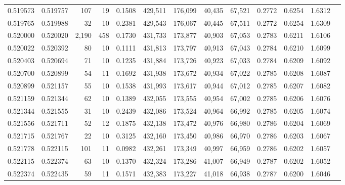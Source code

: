 \begin{tabular}{rrrrrrrrrrrrr}
0.519573 & 0.519757 &   107 &  19 &                                     0.1508 & 429,511 & 176,099 &  40,435 &  67,521 & 0.2772 & 0.6254 & 1.6312 \\
0.519765 & 0.519988 &    32 &  10 &                                     0.2381 & 429,543 & 176,067 &  40,445 &  67,511 & 0.2772 & 0.6254 & 1.6309 \\
0.520000 & 0.520020 & 2,190 & 458 &                                     0.1730 & 431,733 & 173,877 &  40,903 &  67,053 & 0.2783 & 0.6211 & 1.6106 \\
0.520022 & 0.520392 &    80 &  10 &                                     0.1111 & 431,813 & 173,797 &  40,913 &  67,043 & 0.2784 & 0.6210 & 1.6099 \\
0.520403 & 0.520694 &    71 &  10 &                                     0.1235 & 431,884 & 173,726 &  40,923 &  67,033 & 0.2784 & 0.6209 & 1.6092 \\
0.520700 & 0.520899 &    54 &  11 &                                     0.1692 & 431,938 & 173,672 &  40,934 &  67,022 & 0.2785 & 0.6208 & 1.6087 \\
0.520899 & 0.521157 &    55 &  10 &                                     0.1538 & 431,993 & 173,617 &  40,944 &  67,012 & 0.2785 & 0.6207 & 1.6082 \\
0.521159 & 0.521344 &    62 &  10 &                                     0.1389 & 432,055 & 173,555 &  40,954 &  67,002 & 0.2785 & 0.6206 & 1.6076 \\
0.521344 & 0.521555 &    31 &  10 &                                     0.2439 & 432,086 & 173,524 &  40,964 &  66,992 & 0.2785 & 0.6205 & 1.6074 \\
0.521556 & 0.521711 &    52 &  12 &                                     0.1875 & 432,138 & 173,472 &  40,976 &  66,980 & 0.2786 & 0.6204 & 1.6069 \\
0.521715 & 0.521767 &    22 &  10 &                                     0.3125 & 432,160 & 173,450 &  40,986 &  66,970 & 0.2786 & 0.6203 & 1.6067 \\
0.521778 & 0.522115 &   101 &  11 &                                     0.0982 & 432,261 & 173,349 &  40,997 &  66,959 & 0.2786 & 0.6202 & 1.6057 \\
0.522115 & 0.522374 &    63 &  10 &                                     0.1370 & 432,324 & 173,286 &  41,007 &  66,949 & 0.2787 & 0.6202 & 1.6052 \\
0.522374 & 0.522435 &    59 &  11 &                                     0.1571 & 432,383 & 173,227 &  41,018 &  66,938 & 0.2787 & 0.6200 & 1.6046 \\

\end{tabular}
